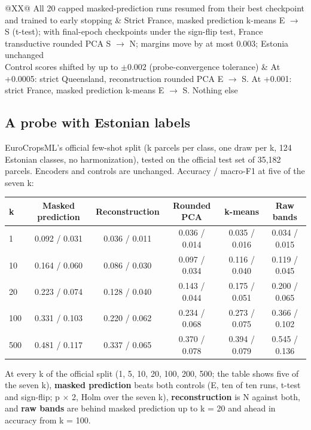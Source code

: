 \documentclass[10pt]{article}
\begin{document}
{\begin{xltabular}{\linewidth}{@{}XX@{}}
All 20 capped masked-prediction runs resumed from their best checkpoint and trained to early stopping & Strict France, masked prediction \textminus{} k-means E $\rightarrow$ S (t-test); with final-epoch checkpoints under the sign-flip test, France transductive \textminus{} rounded PCA S $\rightarrow$ N; margins move by at most 0.003; Estonia unchanged \\
Control scores shifted by up to $\pm$0.002 (probe-convergence tolerance) & At +0.0005: strict Queensland, reconstruction \textminus{} rounded PCA E $\rightarrow$ S. At +0.001: strict France, masked prediction \textminus{} k-means E $\rightarrow$ S. Nothing else \\
\bottomrule
\end{xltabular}}

\subsection{A probe with Estonian labels}

EuroCropsML's official few-shot split (k parcels per class, one draw per k, 124 Estonian classes, no harmonization), tested on the official test set of 35,182 parcels. Encoders and controls are unchanged. Accuracy / macro-F1 at five of the seven k:

\begin{center}\footnotesize
\begin{tabular}{@{}lccccc@{}}
\toprule
k & Masked prediction & Reconstruction & Rounded PCA & k-means & Raw bands \\
\midrule
1 & 0.092 / 0.031 & 0.036 / 0.011 & 0.036 / 0.014 & 0.035 / 0.016 & 0.034 / 0.015 \\
10 & 0.164 / 0.060 & 0.086 / 0.030 & 0.097 / 0.034 & 0.116 / 0.040 & 0.119 / 0.045 \\
20 & 0.223 / 0.074 & 0.128 / 0.040 & 0.143 / 0.044 & 0.175 / 0.051 & 0.200 / 0.065 \\
100 & 0.331 / 0.103 & 0.220 / 0.062 & 0.234 / 0.068 & 0.273 / 0.075 & 0.366 / 0.102 \\
500 & 0.481 / 0.117 & 0.337 / 0.065 & 0.370 / 0.078 & 0.394 / 0.079 & 0.545 / 0.136 \\
\bottomrule
\end{tabular}
\end{center}

At every k of the official split (1, 5, 10, 20, 100, 200, 500; the table shows five of the seven k), \textbf{masked prediction} beats both controls (E, ten of ten runs, t-test and sign-flip; p $\times$ 2, Holm over the seven k), \textbf{reconstruction} is N against both, and \textbf{raw bands} are behind masked prediction up to k = 20 and ahead in accuracy from k = 100.
\end{document}
